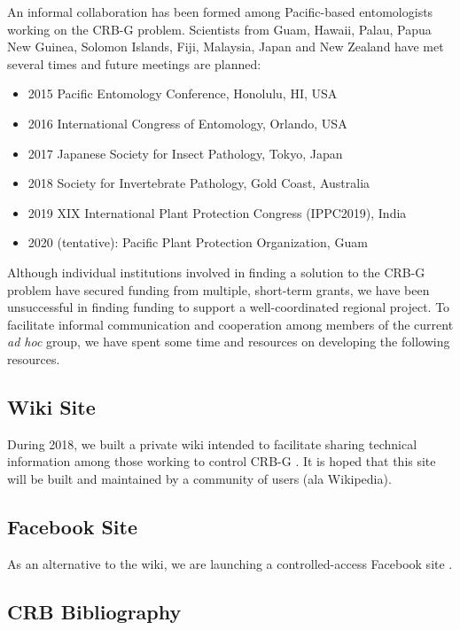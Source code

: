 \documentclass[12pt,letterpaper,english,bibliography=totocnumbered]{scrartcl}
\begin{document}
An informal collaboration has been formed among Pacific-based entomologists working on the CRB-G problem. Scientists from Guam, Hawaii, Palau, Papua New Guinea, Solomon Islands, Fiji, Malaysia, Japan and New Zealand have met several times and future meetings are planned:
\begin{itemize}
	\item 2015 Pacific Entomology Conference, Honolulu, HI, USA
	\item 2016 International Congress of Entomology, Orlando, USA
	\item 2017 Japanese Society for Insect Pathology, Tokyo, Japan
	\item 2018 Society for Invertebrate Pathology, Gold Coast, Australia
	\item 2019 XIX International Plant Protection Congress (IPPC2019), India
	\item 2020 (tentative): Pacific Plant Protection Organization, Guam	
\end{itemize}

Although individual institutions involved in finding a solution to the CRB-G problem
have secured funding from multiple, short-term grants, we have been unsuccessful in
finding funding to support a well-coordinated regional project. To facilitate informal
communication and cooperation among members of the current \textit{ad hoc} group, we have
spent some time and resources on developing the following resources.

\subsection{Wiki Site}

During 2018, we built a private wiki intended to facilitate sharing technical information among those working to control CRB-G \cite{moore_crb-g_2019}. It is hoped that this site will be built and maintained by a community of users (ala Wikipedia).

\subsection{Facebook Site}

As an alternative to the wiki, we are launching a controlled-access Facebook site \cite{moore_facebook_2019}.

\subsection{CRB Bibliography}
\end{document}
